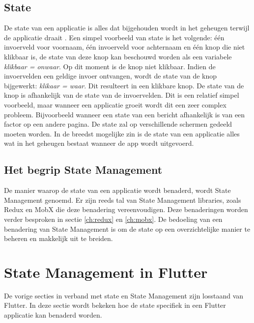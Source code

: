 \subsection{State}
\label{ch:state}
De state van een applicatie is alles dat bijgehouden wordt in het geheugen terwijl de applicatie draait \autocite{DeConinck2019}.
Een simpel voorbeeld van state is het volgende: één invoerveld voor voornaam, één invoerveld voor achternaam en één knop die niet klikbaar is, de state van deze knop kan beschouwd worden als een variabele \textit{klikbaar = onwaar}. Op dit moment is de knop niet klikbaar. Indien de invoervelden een geldige invoer ontvangen, wordt de state van de knop bijgewerkt: \textit{klikaar = waar}. Dit resulteert in een klikbare knop. De state van de knop is afhankelijk van de state van de invoervelden. Dit is een relatief simpel voorbeeld, maar wanneer een applicatie groeit wordt dit een zeer complex probleem. Bijvoorbeeld wanneer een state van een bericht afhankelijk is van een factor op een andere pagina. De state zal op verschillende schermen gedeeld moeten worden.
In de breedst mogelijke zin is de state van een applicatie alles wat in het geheugen bestaat wanneer de app wordt uitgevoerd. 

\subsection{Het begrip State Management}
De manier waarop de state van een applicatie wordt benaderd, wordt State Management genoemd. Er zijn reeds tal van State Management libraries, zoals Redux en MobX die deze benadering vereenvoudigen. Deze benaderingen worden verder besproken in sectie \ref{ch:redux} en \ref{ch:mobx}. De bedoeling van een benadering van State Management is om de state op een overzichtelijke manier te beheren en makkelijk uit te breiden.

\section{State Management in Flutter}
De vorige secties in verband met state en State Management zijn losstaand van Flutter. In deze sectie wordt bekeken hoe de state specifiek in een Flutter applicatie kan benaderd worden.

